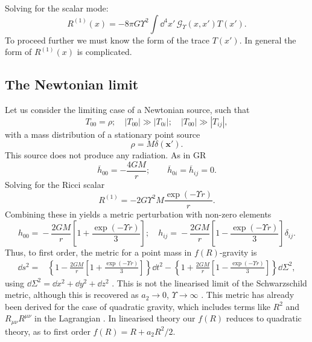 Solving for the scalar mode:
\begin{equation}
R^{(1)}(x) = -8 \pi G \Upsilon^2 \int \dd^4 x'\, \mathscr{G}_\Upsilon(x, x') T(x').
\end{equation}
To proceed further we must know the form of the trace $T(x')$. In general the form of $R^{(1)}(x)$ is complicated.

\subsection{The Newtonian limit}

Let us consider the limiting case of a Newtonian source, such that
\begin{equation}
T_{00} = \rho; \quad |T_{00}| \gg |T_{0i}|; \quad |T_{00}| \gg |T_{ij}|,
\end{equation}
with a mass distribution of a stationary point source
\begin{equation}
\rho = M\delta(\boldsymbol{x'}).
\end{equation}
This source does not produce any radiation. As in GR
\begin{equation}
\overline{h}_{00} = -\frac{4GM}{r}; \qquad \overline{h}_{0i} = \overline{h}_{ij} = 0.
\end{equation}
Solving for the Ricci scalar \citep{Havas1977}
\begin{equation}
R^{(1)} = -2 G \Upsilon^2 M \frac{\exp(- \Upsilon r)}{r}.
\end{equation}
Combining these in  yields a metric perturbation with non-zero elements 
\begin{equation}
h_{00} = {} -\frac{2GM}{r}\left[1 + \frac{\exp(- \Upsilon r)}{3}\right]; \quad
h_{ij} = {} -\frac{2GM}{r}\left[1 - \frac{\exp(- \Upsilon r)}{3}\right]\delta_{ij}.
\end{equation}
Thus, to first order, the metric for a point mass in $f(R)$-gravity is
\begin{align}
\dd s^2 = {} & \left\{1-\frac{2GM}{r}\left[1 + \frac{\exp(- \Upsilon r)}{3}\right]\right\}\dd t^2 - \left\{1+\frac{2GM}{r}\left[1 - \frac{\exp(- \Upsilon r)}{3}\right]\right\}\dd \Sigma^2,
\label{eq:f(R)_Schw}
\end{align}
using $\dd \Sigma^2 = \dd x^2 + \dd y^2 + \dd z^2$ \citep{Capozziello2007, Capozziello2009a, Naf2010}. This is not the linearised limit of the Schwarzschild metric, although this is recovered as $a_2 \rightarrow 0$, $\Upsilon \rightarrow \infty$ \citep{Chiba2007a}. This metric has already been derived for the case of quadratic gravity, which includes terms like $R^2$ and $R_{\mu\nu}R^{\mu\nu}$ in the Lagrangian \citep{Pechlaner1966, Stelle1978, Schmidt1986, Teyssandier1990}. In linearised theory our $f(R)$ reduces to quadratic theory, as to first order $f(R) = R + a_2 R^2/2$.

